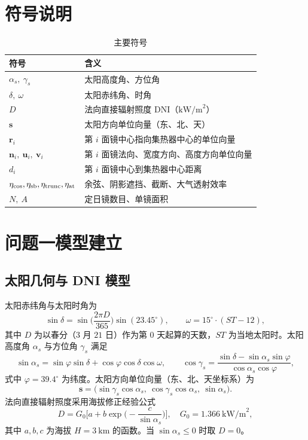 \documentclass[12pt,a4paper]{ctexart}
\begin{document}
\section{符号说明}
\begin{table}[H]
\centering
\caption{主要符号}
\begin{tabular}{ll}
\toprule
符号 & 含义 \\
\midrule
$\alpha_s,\ \gamma_s$ & 太阳高度角、方位角 \\
$\delta,\ \omega$ & 太阳赤纬角、时角 \\
$D$ & 法向直接辐射照度 DNI（$\text{kW/m}^2$） \\
$\boldsymbol{s}$ & 太阳方向单位向量（东、北、天） \\
$\boldsymbol{r}_i$ & 第 $i$ 面镜中心指向集热器中心的单位向量 \\
$\boldsymbol{n}_i,\ \boldsymbol{u}_i,\ \boldsymbol{v}_i$ & 第 $i$ 面镜法向、宽度方向、高度方向单位向量 \\
$d_i$ & 第 $i$ 面镜中心到集热器中心距离 \\
$\eta_{\cos},\eta_{\rm sb},\eta_{\rm trunc},\eta_{\rm at}$ & 余弦、阴影遮挡、截断、大气透射效率 \\
$N,\ A$ & 定日镜数目、单镜面积 \\
\bottomrule
\end{tabular}
\end{table}

\section{问题一模型建立}

\subsection{太阳几何与 DNI 模型}
太阳赤纬角与太阳时角为
\begin{equation}
  \sin\delta = \sin\!\Big(\frac{2\pi D}{365}\Big)\sin(23.45^\circ),
  \qquad
  \omega = 15^\circ \cdot (ST-12),
\end{equation}
其中 $D$ 为以春分（$3$ 月 $21$ 日）作为第 $0$ 天起算的天数，$ST$ 为当地太阳时。太阳高度角 $\alpha_s$ 与方位角 $\gamma_s$ 满足
\begin{equation}
  \sin\alpha_s = \sin\varphi\sin\delta + \cos\varphi\cos\delta\cos\omega,
  \qquad
  \cos\gamma_s = \frac{\sin\delta - \sin\alpha_s\sin\varphi}{\cos\alpha_s\cos\varphi},
\end{equation}
式中 $\varphi = 39.4^\circ$ 为纬度。太阳方向单位向量（东、北、天坐标系）为
\begin{equation}
  \boldsymbol{s} = \big(\sin\gamma_s\cos\alpha_s,\ \cos\gamma_s\cos\alpha_s,\ \sin\alpha_s\big).
\end{equation}
法向直接辐射照度采用海拔修正经验公式
\begin{equation}
  D = G_0\Big[a + b\exp\!\Big(-\frac{c}{\sin\alpha_s}\Big)\Big],\quad
  G_0 = 1.366\ \text{kW/m}^2,
\end{equation}
其中 $a,b,c$ 为海拔 $H=3\ \text{km}$ 的函数。当 $\sin\alpha_s \le 0$ 时取 $D=0$。
\end{document}
